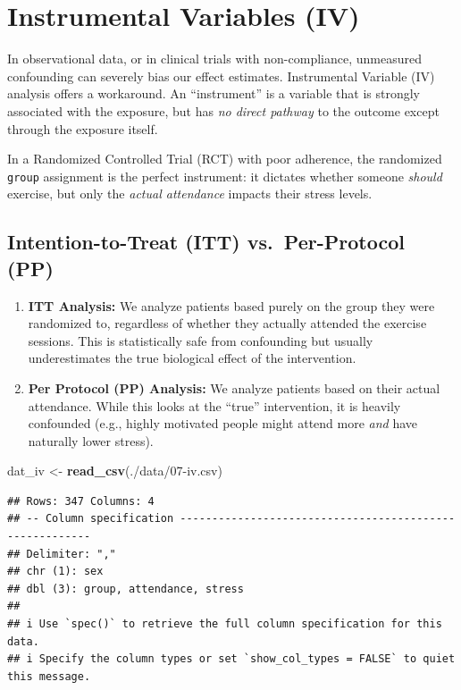 \documentclass[
]{book}
\newenvironment{Shaded}{\begin{snugshade}}{\end{snugshade}}
\newcommand{\FunctionTok}[1]{\textcolor[rgb]{0.13,0.29,0.53}{\textbf{#1}}}
\newcommand{\NormalTok}[1]{#1}
\newcommand{\OtherTok}[1]{\textcolor[rgb]{0.56,0.35,0.01}{#1}}
\newcommand{\StringTok}[1]{\textcolor[rgb]{0.31,0.60,0.02}{#1}}
\providecommand{\tightlist}{%
  \setlength{\itemsep}{0pt}\setlength{\parskip}{0pt}}
\begin{document}
\section{Instrumental Variables (IV)}\label{instrumental-variables-iv}

In observational data, or in clinical trials with non-compliance, unmeasured confounding can severely bias our effect estimates. Instrumental Variable (IV) analysis offers a workaround. An ``instrument'' is a variable that is strongly associated with the exposure, but has \emph{no direct pathway} to the outcome except through the exposure itself.

In a Randomized Controlled Trial (RCT) with poor adherence, the randomized \texttt{group} assignment is the perfect instrument: it dictates whether someone \emph{should} exercise, but only the \emph{actual attendance} impacts their stress levels.

\subsection{Intention-to-Treat (ITT) vs.~Per-Protocol (PP)}\label{intention-to-treat-itt-vs.-per-protocol-pp}

\begin{enumerate}
\def\labelenumi{\arabic{enumi}.}
\tightlist
\item
  \textbf{ITT Analysis:} We analyze patients based purely on the group they were randomized to, regardless of whether they actually attended the exercise sessions. This is statistically safe from confounding but usually underestimates the true biological effect of the intervention.
\item
  \textbf{Per Protocol (PP) Analysis:} We analyze patients based on their actual attendance. While this looks at the ``true'' intervention, it is heavily confounded (e.g., highly motivated people might attend more \emph{and} have naturally lower stress).
\end{enumerate}

\begin{Shaded}
\begin{Highlighting}[]
\NormalTok{dat\_iv }\OtherTok{\textless{}{-}} \FunctionTok{read\_csv}\NormalTok{(}\StringTok{\textquotesingle{}./data/07{-}iv.csv\textquotesingle{}}\NormalTok{)}
\end{Highlighting}
\end{Shaded}

\begin{verbatim}
## Rows: 347 Columns: 4
## -- Column specification --------------------------------------------------------
## Delimiter: ","
## chr (1): sex
## dbl (3): group, attendance, stress
## 
## i Use `spec()` to retrieve the full column specification for this data.
## i Specify the column types or set `show_col_types = FALSE` to quiet this message.
\end{verbatim}
\end{document}
